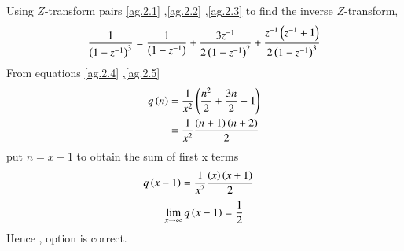 \documentclass[beamer]{IEEEtran}
\theoremstyle{remark}
\begin{document}
Using $Z$-transform pairs \eqref{ag.2.1} ,\eqref{ag.2.2} ,\eqref{ag.2.3} to find the inverse $Z$-transform,
\begin{align}
	\frac{1}{\left(1-z^{-1}\right)^{3}} = \frac{1}{\left(1-z^{-1}\right)}+\frac{3z^{-1}}{2\left(1-z^{-1}\right)^2}+\frac{z^{-1}\left(z^{-1}+1\right)}{2\left(1-z^{-1}\right)^3} \label{ag.2.5}
\end{align}
From equations \eqref{ag.2.4} ,\eqref{ag.2.5}
\begin{align}
	q\left(n\right)&=\frac{1}{x^2}\left(\frac{n^2}{2}+\frac{3n}{2}+1\right) \\
	&=\frac{1}{x^2}\frac{\left(n+1\right)\left(n+2\right)}{2}
 \end{align}
 put $n=x-1$ to obtain the sum of first x terms
 \begin{align}
	q\left(x-1\right)&=\frac{1}{x^2}\frac{\left(x\right)\left(x+1\right)}{2} 
\end{align}
\begin{align}
    \lim_{x\to\infty}q\left(x-1\right)=\frac{1}{2}
\end{align}
Hence , option  is correct.
\end{document}
